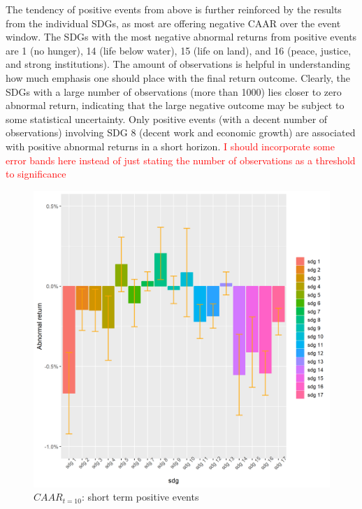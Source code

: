 The tendency of positive events from above is further reinforced by the results from the individual SDGs, as most are offering negative CAAR over the event window. The SDGs with the most negative abnormal returns from positive events are 1 (no hunger), 14 (life below water), 15 (life on land), and 16 (peace, justice, and strong institutions). The amount of observations is helpful in understanding how much emphasis one should place with the final return outcome. Clearly, the SDGs with a large number of observations (more than 1000) lies closer to zero abnormal return, indicating that the large negative outcome may be subject to some statistical uncertainty. Only positive events (with a decent number of observations) involving SDG 8 (decent work and economic growth) are associated with positive abnormal returns in a short horizon. \textcolor{red}{I should incorporate some error bands here instead of just stating the number of observations as a threshold to significance}
 
 
\begin{figure} [H]
    \centering
    \includegraphics[scale=0.6]{Projekt/1.Figures analysis/ST_positive_sdg_bar.png}
    \caption{$CAAR_{t=10}$: short term positive events}
    \label{fig:ST_pos_bar}
\end{figure}


 \label{ST_tab}

